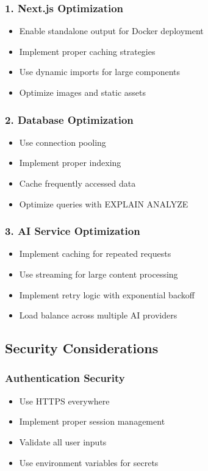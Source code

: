 \documentclass[12pt,a4paper]{article}
\begin{document}
\subsubsection{1. Next.js Optimization}
\begin{itemize}
    \item Enable standalone output for Docker deployment
    \item Implement proper caching strategies
    \item Use dynamic imports for large components
    \item Optimize images and static assets
\end{itemize}

\subsubsection{2. Database Optimization}
\begin{itemize}
    \item Use connection pooling
    \item Implement proper indexing
    \item Cache frequently accessed data
    \item Optimize queries with EXPLAIN ANALYZE
\end{itemize}

\subsubsection{3. AI Service Optimization}
\begin{itemize}
    \item Implement caching for repeated requests
    \item Use streaming for large content processing
    \item Implement retry logic with exponential backoff
    \item Load balance across multiple AI providers
\end{itemize}

\subsection{Security Considerations}

\subsubsection{Authentication Security}
\begin{itemize}
    \item Use HTTPS everywhere
    \item Implement proper session management
    \item Validate all user inputs
    \item Use environment variables for secrets
\end{itemize}
\end{document}

